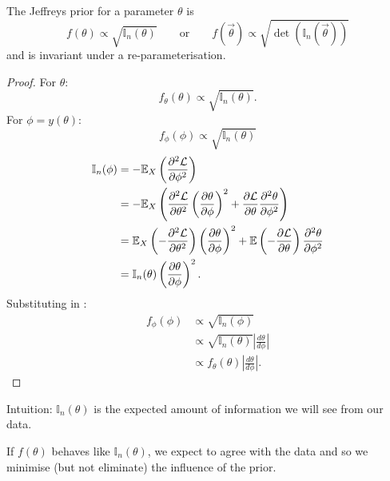 \documentclass[10pt, a4paper]{article}
\begin{document}
\begin{proposition}
    The Jeffreys prior for a parameter $\theta$ is
    \[
    f(\theta) \propto \sqrt{\mathbb{I}_n(\theta)}\qquad\text{or}\qquad f(\vec{\theta}) \propto \sqrt{\det(\mathbb{I}_n(\vec{\theta}))}
    \]
    and is invariant under a re-parameterisation.

    \begin{proof}
        For $\theta$:
        \[
        f_{\theta}(\theta) \propto \sqrt{\mathbb{I}_n(\theta)}.
        \]
        For $\phi = y(\theta)$:
        \[
        f_{\phi}(\phi) \propto \sqrt{\mathbb{I}_n(\theta)}
        \]
        \begin{align*}
            \mathbb{I}_n(\phi) &= -\E_{X}\left(\frac{\partial ^ 2\mathcal{L}}{\partial\phi ^ 2}\right) \\
            &= -\E_{X}\left(\frac{\partial ^ 2\mathcal{L}}{\partial \theta ^ 2}\left(\pd[\theta]{\phi}\right) ^ 2 + \pd[\mathcal{L}]{\theta}\frac{\partial ^ 2\theta}{\partial\phi ^ 2}\right) \\
            &= \E_{X}\left(-\frac{\partial ^ 2\mathcal{L}}{\partial\theta ^ 2}\right)\left(\frac{\partial \theta}{\partial \phi}\right) ^ 2 + \E\left(-\pd[\mathcal{L}]{\theta}\right)\frac{\partial ^ 2\theta}{\partial \phi ^ 2} \\
            &= \mathbb{I}_n(\theta)\left(\pd[\theta]{\phi}\right) ^ 2.
        \end{align*}
        Substituting in :
        \begin{align*}
            f_{\phi}(\phi) &\propto \sqrt{\mathbb{I}_n(\phi)} \\
            &\propto \sqrt{\mathbb{I}_n(\theta)}\left|\frac{d\theta}{d\phi}\right| \\
            &\propto f_{\theta}(\theta)\left|\frac{d\theta}{d\phi}\right|.
        \end{align*}
    \end{proof}
\end{proposition}

Intuition:
$\mathbb{I}_n(\theta)$ is the expected amount of information we will see from our data.

If $f(\theta)$ behaves like $\mathbb{I}_n(\theta)$,
we expect to agree with the data
and so we minimise
(but not eliminate)
the influence of the prior.
\end{document}
